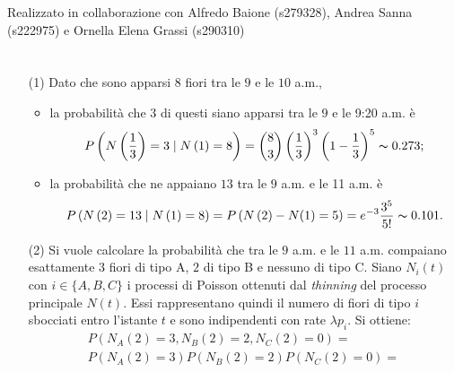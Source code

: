 \documentclass[11pt,largemargins]{homework}
\begin{document}
\maketitle
\begin{center}
Realizzato in collaborazione con Alfredo Baione (s279328), Andrea Sanna (s222975) e Ornella Elena Grassi (s290310)
\end{center}
\section{}%
  
    
    
  \begin{enumerate}
 
  
    \item[(1)]
    Dato che sono apparsi $8$ fiori tra le $9$ e le $10$ a.m.,
    \begin{itemize}
    \item
    la probabilità che $3$ di questi siano apparsi tra le $9$ e le 9:20 a.m. è
    \begin{equation*}
    P\left(N\left(\frac{1}{3}\right)=3\mid N\left(1\right)=8\right)=\binom{8}{3}\left(\frac{1}{3}\right)^{3}\left(1-\frac{1}{3}\right)^{5}\thicksim 0.273;
    \end{equation*}
    \item
    la probabilità che ne appaiano $13$ tra le $9$ a.m. e le 11 a.m. è
     \begin{gather*}
     P\left(N\left(2\right)=13\mid N\left(1\right)=8\right)=P\left(N\left(2\right) - N(1)=5\right)=e^{-3}\frac{3^{5}}{5!}\thicksim 0.101.
     \end{gather*}
    \end{itemize} 
    \item[(2)]
    Si vuole calcolare la probabilità che tra le $9$ a.m. e le $11$ a.m. compaiano esattamente $3$ fiori di tipo A, $2$ di tipo B e nessuno di tipo C. Siano $N_{i}\left(t\right)$ con $i \in \{A, B, C\}$ i processi di Poisson ottenuti dal \textit{thinning} del processo principale \(N(t)\). Essi rappresentano quindi il numero di fiori di tipo \(i\) sbocciati entro l'istante \(t\) e sono indipendenti con rate \(\lambda p_i\). Si ottiene:
    \begin{gather*}
    P\left(N_{A}\left(2\right)=3, N_{B}\left(2\right)=2,N_{C}\left(2\right)=0\right)=\\
    P(N_A(2)=3)P(N_B(2)=2)P(N_C(2)=0)=\\

\end{gather*}
\end{enumerate}
\end{document}
